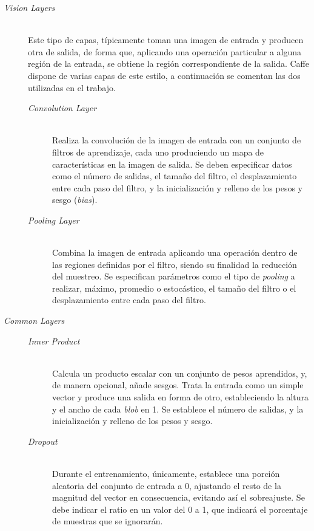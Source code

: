\begin{description}
\item[\textit{Vision Layers}] \hfill 
\vspace{10pt}
\\
	Este tipo de capas, típicamente toman una imagen de entrada y producen otra de salida, de forma que, aplicando una operación particular a alguna región de la entrada, se obtiene la región correspondiente de la salida. Caffe dispone de varias capas de este estilo, a continuación se comentan las dos utilizadas en el trabajo.
	\vspace{10pt}
	\begin{description}
	\item[\textit{Convolution Layer}] \hfill 
	\vspace{5pt}
	\\
		Realiza la convolución de la imagen de entrada con un conjunto de filtros de aprendizaje, cada uno produciendo un mapa de características en la imagen de salida. Se deben especificar datos como el número de salidas, el tamaño del filtro, el desplazamiento entre cada paso del filtro, y la inicialización y relleno de los pesos y sesgo (\textit{bias}).
		\vspace{10pt}
	\item[\textit{Pooling Layer}] \hfill 
	\vspace{5pt}
	\\
		Combina la imagen de entrada aplicando una operación dentro de las regiones definidas por el filtro, siendo su finalidad la reducción del muestreo. Se especifican parámetros como el tipo de \textit{pooling} a realizar, máximo, promedio o estocástico, el tamaño del filtro o el desplazamiento entre cada paso del filtro.
	\end{description}

\item[\textit{Common Layers}] \hfill
	\begin{description}
	\item[\textit{Inner Product}] \hfill 
	\vspace{5pt}
	\\
	Calcula un producto escalar con un conjunto de pesos aprendidos, y, de manera opcional, añade sesgos. Trata la entrada como un simple vector y produce una salida en forma de otro, estableciendo la altura y el ancho de cada \textit{blob} en 1. Se establece el número de salidas, y la inicialización y relleno de los pesos y sesgo.
	\vspace{10pt}
	\item[\textit{Dropout}] \hfill 
	\vspace{5pt}
	\\
	Durante el entrenamiento, únicamente, establece una porción aleatoria del conjunto de entrada a 0, ajustando el resto de la magnitud del vector en consecuencia, evitando así el sobreajuste. Se debe indicar el ratio en un valor del 0 a 1, que indicará el porcentaje de muestras que se ignorarán.
	\end{description}


\end{description}
